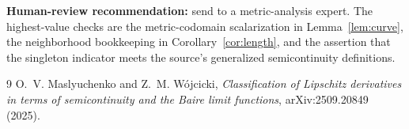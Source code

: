 \documentclass[11pt]{article}
\theoremstyle{definition}
\begin{document}
\textbf{Human-review recommendation:} send to a metric-analysis expert.  The
highest-value checks are the metric-codomain scalarization in
Lemma~\ref{lem:curve}, the neighborhood bookkeeping in
Corollary~\ref{cor:length}, and the assertion that the singleton indicator
meets the source's generalized semicontinuity definitions.

\begin{thebibliography}{9}
O.~V. Maslyuchenko and Z.~M. W\'ojcicki,
\emph{Classification of Lipschitz derivatives in terms of semicontinuity and
the Baire limit functions}, arXiv:2509.20849 (2025).

\end{thebibliography}
\end{document}
